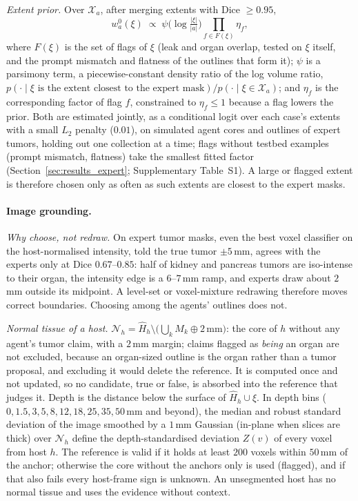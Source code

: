 \documentclass[fleqn,10pt]{olplainarticle}
\begin{document}
\emph{Extent prior.} Over $\mathcal{X}_a$, after merging extents with Dice $\ge0.95$,
\begin{equation}
\label{eq:extent_prior}
w^0_a(\xi)\;\propto\;\psi\bigl(\log\tfrac{|\xi|}{|a|}\bigr)\prod_{f\in F(\xi)}\eta_f,
\end{equation}
where $F(\xi)$ is the set of flags of $\xi$ (leak and organ overlap, tested on $\xi$ itself, and the prompt mismatch and
flatness of the outlines that form it); $\psi$ is a parsimony term, a piecewise-constant density ratio of the log volume
ratio, $p(\cdot\mid\xi\text{ is the extent closest to the expert mask})/p(\cdot\mid\xi\in\mathcal{X}_a)$; and $\eta_f$ is
the corresponding factor of flag $f$, constrained to $\eta_f\le1$ because a flag lowers the prior. Both are estimated
jointly, as a conditional logit over each case's extents with a small $L_2$ penalty ($0.01$), on simulated agent cores
and outlines of expert tumors, holding out one collection at a time; flags without testbed examples (prompt mismatch,
flatness) take the smallest fitted factor (Section~\ref{sec:results_expert}; Supplementary Table~S1). A large or
flagged extent is therefore chosen only as often as such extents are closest to the expert masks.

\paragraph{Image grounding.}
\label{sec:grounding_details}
\emph{Why choose, not redraw.} On expert tumor masks, even the best voxel classifier on the host-normalised intensity, told
the true tumor $\pm5$\,mm, agrees with the experts only at Dice $0.67$--$0.85$: half of kidney and pancreas tumors are
iso-intense to their organ, the intensity edge is a $6$--$7$\,mm ramp, and experts draw about $2$\,mm outside its midpoint.
A level-set or voxel-mixture redrawing therefore moves correct boundaries. Choosing among the agents' outlines does not.

\emph{Normal tissue of a host.} $\mathcal{N}_h=\hat H_h\setminus\bigl(\bigcup_k M_k\oplus2\,\mathrm{mm}\bigr)$: the core of
$h$ without any agent's tumor claim, with a $2$\,mm margin; claims flagged as \emph{being} an organ are not excluded, because an
organ-sized outline is the organ rather than a tumor proposal, and excluding it would delete the reference. It is computed once and not updated, so no candidate, true or
false, is absorbed into the reference that judges it. Depth is the distance below the surface of $\hat H_h\cup\xi$. In
depth bins ($0,1.5,3,5,8,12,18,25,35,50$\,mm and beyond), the median and robust standard deviation of the image smoothed by
a $1$\,mm Gaussian (in-plane when slices are thick) over $\mathcal{N}_h$ define the depth-standardised deviation $Z(v)$ of
every voxel from host $h$. The reference is valid if it holds at least $200$ voxels within $50$\,mm of the anchor; otherwise
the core without the anchors only is used (flagged), and if that also fails every host-frame sign is unknown. An
unsegmented host has no normal tissue and uses the evidence without context.
\end{document}
